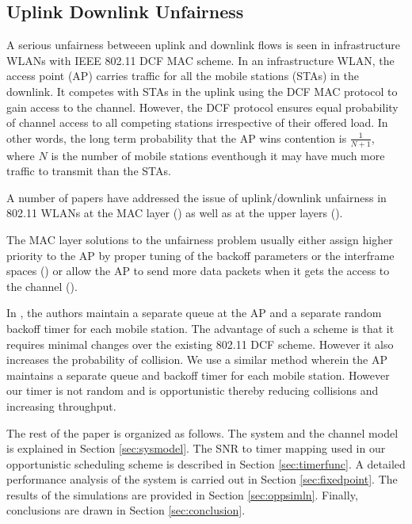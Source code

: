 \documentclass[10pt,conference]{IEEEtran}
\begin{document}
\subsection{Uplink Downlink Unfairness}
\label{sec:ul_dl}
A serious unfairness betweeen uplink and downlink flows is seen in infrastructure WLANs with IEEE 802.11 DCF MAC scheme.
In an infrastructure WLAN, the access point (AP) carries traffic for all the mobile stations (STAs) in the downlink. 
It competes with STAs in the uplink using the DCF MAC protocol to gain access to the channel. 
However, the DCF protocol ensures equal probability of channel access to all competing stations irrespective of their offered load. In other words, the long term probability that the AP wins contention is $\frac{1}{N+1}$,
where  $N$ is the number of mobile stations eventhough it may have much more traffic to transmit than the STAs.  

A number of papers have addressed the issue of uplink/downlink unfairness in 802.11 WLANs at the MAC layer (\cite{lopez2008,hirantha2008dynamic,kim2005downlink,gopalakrishnan2004,keceliweighted}) 
as well as at the upper layers (\cite{pilosof2003understanding,wu2005upstream,ha2006wlc29}).

The MAC layer solutions to the unfairness problem usually either assign higher priority to the AP by proper tuning of the backoff parameters or the interframe spaces (\cite{lopez2008,hirantha2008dynamic,kim2005downlink}) or 
allow the AP to send more data packets when it gets the access to the channel (\cite{gopalakrishnan2004,keceliweighted,hiraguri2013}). 

In \cite{siwam2008}, the authors maintain a separate queue at the AP and a separate random backoff timer for each mobile station.
The advantage of such a scheme is that it requires minimal changes over the existing 802.11 DCF scheme.
However it also increases the probability of collision. 
We use a similar method wherein the AP maintains a separate queue and backoff timer for each mobile station. 
However our timer is not random  and is opportunistic thereby reducing collisions and increasing throughput. 

The rest of the paper is organized as follows. The system
and the channel model is explained in Section \ref{sec:sysmodel}. 
The SNR to timer mapping used in our opportunistic scheduling scheme is described in Section \ref{sec:timerfunc}. 
A detailed performance analysis of the system is carried out
in Section \ref{sec:fixedpoint}. The results of the simulations are provided in
Section \ref{sec:oppsimln}. Finally, conclusions are drawn in Section \ref{sec:conclusion}.
\end{document}
